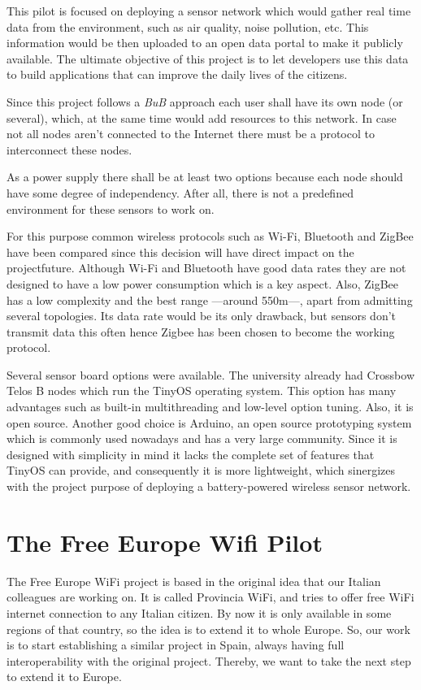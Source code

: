 \documentclass[draftclsnofoot,12pt,journal,onecolumn]{IEEEtran}
\begin{document}
This pilot is focused on deploying a sensor network which would gather real time data from the environment, such as air quality, noise pollution, etc. This information would be then uploaded to an open data portal to make it publicly available. The ultimate objective of this project is to let developers use this data to build applications that can improve the daily lives of the citizens.

Since this project follows a \emph{BuB} approach each user shall have its own node (or several), which, at the same time would add resources to this network. In case not all nodes aren't connected to the Internet there must be a protocol to interconnect these nodes.

As a power supply there shall be at least two options because each node should have some degree of independency. After all, there is not a predefined environment for these sensors to work on.

For this purpose common wireless protocols such as Wi-Fi, Bluetooth and ZigBee have been compared since this decision will have direct impact on the projectfuture. Although Wi-Fi and Bluetooth have good data rates they are not designed to have a low power consumption which is a key aspect. Also, ZigBee has a low complexity and the best range ---around 550m---, apart from admitting several topologies. Its data rate would be its only drawback, but sensors don't transmit data this often hence Zigbee has been chosen to become the working protocol.

Several sensor board options were available. The university already had Crossbow Telos B nodes which run the TinyOS operating system. This option has many advantages such as built-in multithreading and low-level option tuning. Also, it is open source. Another good choice is Arduino, an open source prototyping system which is commonly used nowadays and has a very large community. Since it is designed with simplicity in mind it lacks the complete set of features that TinyOS can provide, and consequently it is more lightweight, which sinergizes with the project purpose of deploying a battery-powered wireless sensor network.

\section{The Free Europe Wifi Pilot}
\label{sec:few}

The Free Europe WiFi project is based in the original idea that our Italian colleagues are working on. It is called Provincia WiFi, and tries to offer free WiFi internet connection to any Italian citizen. By now it is only available in some regions of that country, so the idea is to extend it to whole Europe. So, our work is to start establishing a similar project in Spain, always having full interoperability with the original project. Thereby, we want to take the next step to extend it to Europe.
\end{document}
